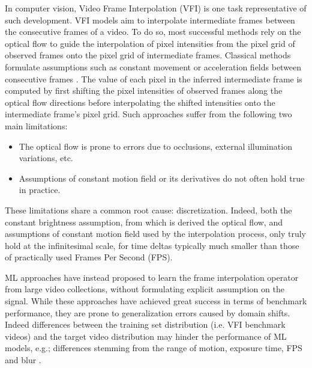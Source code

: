 \documentclass{article}
\begin{document}
In computer vision, Video Frame Interpolation (VFI) is one task representative of such development.
VFI models aim to interpolate intermediate frames between the consecutive frames of a video.
To do so, most successful methods rely on the optical flow
to guide the interpolation of pixel intensities from the pixel grid of observed frames onto the pixel grid of intermediate frames.
Classical methods formulate assumptions such as constant movement or acceleration fields between consecutive frames \cite{baker2011database} \cite{barron1994performance} \cite{herbst2009occlusion}.
The value of each pixel in the inferred intermediate frame is computed by first shifting the pixel intensities of observed frames along the
optical flow directions before interpolating the shifted intensities onto the intermediate frame's pixel grid.
Such approaches suffer from the following two main limitations:

\begin{itemize}
\item The optical flow is prone to errors due to occlusions, external illumination variations, etc.
\item Assumptions of constant motion field or its derivatives do not often hold true in practice.
\end{itemize}

These limitations share a common root cause: discretization.
Indeed, both the constant brightness assumption, from which is derived the optical flow,
and assumptions of constant motion field used by the interpolation process,
only truly hold at the infinitesimal scale, for time deltas typically much smaller than those of practically used Frames Per Second (FPS).

ML approaches \cite{jiang2018super} \cite{li2020video} \cite{park2021asymmetric} \cite{park2020bmbc} \cite{lee2020adacof} have instead proposed to learn the frame interpolation operator from large video collections,
without formulating explicit assumption on the signal.
While these approaches have achieved great success in terms of benchmark performance,
they are prone to generalization errors caused by domain shifts. %
Indeed differences between the training set distribution (i.e. VFI benchmark videos)
and the target video distribution may hinder the performance of ML models, e.g.;
differences stemming from the range of motion, exposure time, FPS and blur \cite{zhang2020video}.
\end{document}
